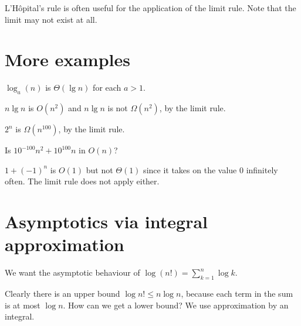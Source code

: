 L'H\^{o}pital's rule is often useful for the application of the limit rule. Note that the 
limit may not exist at all.


\section{More examples}

\begin{Boxample}[4]
$\log_a(n)$ is $\Theta(\lg n)$ for each $a > 1$.
\end{Boxample}

\begin{Boxample}
$n \lg n$ is $O(n^2)$ and $n \lg n$ is not $\Omega(n^2)$, by the limit rule.
\end{Boxample}

\begin{Boxample}
$2^n$ is $\Omega(n^{100})$, by the limit rule.
\end{Boxample}

\begin{Boxample}[4]
Is $10^{-100} n^2 + 10^{100} n$ in $O(n)$?
\end{Boxample}

\begin{Boxample}
$1 + (-1)^n$ is $O(1)$ but not $\Theta(1)$ since it takes on the value $0$
 infinitely often. The limit rule does not apply either.
\end{Boxample}
 
\section{Asymptotics via integral approximation}
\begin{Boxample}[8]
We want the asymptotic behaviour of $\log (n!) = \sum_{k=1}^n \log k$.

Clearly there is an upper bound $\log n! \leq n \log n$, because each term in the sum is at most $\log n$. 
How can we get a lower bound? We use approximation by an integral.


\end{Boxample}

